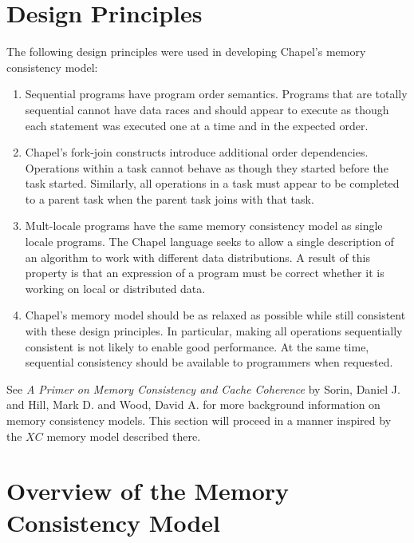 \section{Design Principles}

The following design principles were used in developing Chapel's memory
consistency model:

\begin{enumerate}

  \item Sequential programs have program order semantics.  Programs that
  are totally sequential cannot have data races and should appear to
  execute as though each statement was executed one at a time and in the
  expected order.

  \item Chapel's fork-join constructs introduce additional order
  dependencies.  Operations within a task cannot behave as though they
  started before the task started. Similarly, all operations in a task
  must appear to be completed to a parent task when the parent task joins
  with that task.

  \item Mult-locale programs have the same memory consistency model as
  single locale programs. The Chapel language seeks to allow a single
  description of an algorithm to work with different data distributions.
  A result of this property is that an expression of a program must be
  correct whether it is working on local or distributed data.

  \item Chapel's memory model should be as relaxed as possible while still
  consistent with these design principles. In particular, making all
  operations sequentially consistent is not likely to enable good
  performance. At the same time, sequential consistency should be
  available to programmers when requested.

\end{enumerate}

See \textit{A Primer on Memory Consistency and Cache Coherence} by Sorin,
Daniel J. and Hill, Mark D. and Wood, David A. for more background information
on memory consistency models. This section will proceed in a manner inspired by
the $XC$ memory model described there.

\section{Overview of the Memory Consistency Model}

